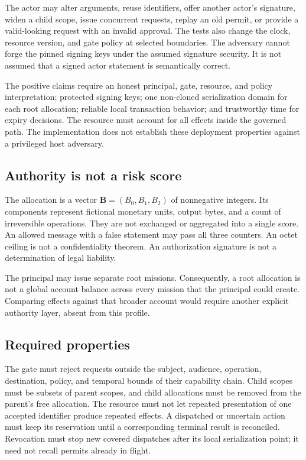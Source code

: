 \documentclass[10pt,journal,a4paper]{IEEEtran}
\newcommand{\Budget}{\mathbf{B}}
\begin{document}
The actor may alter arguments, reuse identifiers, offer another actor's signature, widen a child scope, issue concurrent requests, replay an old permit, or provide a valid-looking request with an invalid approval. The tests also change the clock, resource version, and gate policy at selected boundaries. The adversary cannot forge the pinned signing keys under the assumed signature security. It is not assumed that a signed actor statement is semantically correct.

The positive claims require an honest principal, gate, resource, and policy interpretation; protected signing keys; one non-cloned serialization domain for each root allocation; reliable local transaction behavior; and trustworthy time for expiry decisions. The resource must account for all effects inside the governed path. The implementation does not establish these deployment properties against a privileged host adversary.

\subsection{Authority is not a risk score}
The allocation is a vector $\Budget=(B_0,B_1,B_2)$ of nonnegative integers. Its components represent fictional monetary units, output bytes, and a count of irreversible operations. They are not exchanged or aggregated into a single score. An allowed message with a false statement may pass all three counters. An octet ceiling is not a confidentiality theorem. An authorization signature is not a determination of legal liability.

The principal may issue separate root missions. Consequently, a root allocation is not a global account balance across every mission that the principal could create. Comparing effects against that broader account would require another explicit authority layer, absent from this profile.

\subsection{Required properties}
The gate must reject requests outside the subject, audience, operation, destination, policy, and temporal bounds of their capability chain. Child scopes must be subsets of parent scopes, and child allocations must be removed from the parent's free allocation. The resource must not let repeated presentation of one accepted identifier produce repeated effects. A dispatched or uncertain action must keep its reservation until a corresponding terminal result is reconciled. Revocation must stop new covered dispatches after its local serialization point; it need not recall permits already in flight.
\end{document}

